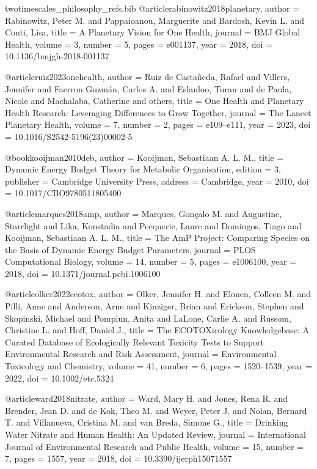 \begin{filecontents*}{twotimescales_philosophy_refs.bib}
@article{rabinowitz2018planetary,
  author  = {Rabinowitz, Peter M. and Pappaioanou, Marguerite and Bardosh, Kevin L. and Conti, Lisa},
  title   = {A Planetary Vision for One Health},
  journal = {BMJ Global Health},
  volume  = {3},
  number  = {5},
  pages   = {e001137},
  year    = {2018},
  doi     = {10.1136/bmjgh-2018-001137}
}

@article{ruiz2023onehealth,
  author  = {Ruiz de Casta{\~n}eda, Rafael and Villers, Jennifer and Faerron Guzm{\'a}n, Carlos A. and Eslanloo, Turan and de Paula, Nicole and Machalaba, Catherine and others},
  title   = {One Health and Planetary Health Research: Leveraging Differences to Grow Together},
  journal = {The Lancet Planetary Health},
  volume  = {7},
  number  = {2},
  pages   = {e109--e111},
  year    = {2023},
  doi     = {10.1016/S2542-5196(23)00002-5}
}

@book{kooijman2010deb,
  author    = {Kooijman, Sebastiaan A. L. M.},
  title     = {Dynamic Energy Budget Theory for Metabolic Organisation},
  edition   = {3},
  publisher = {Cambridge University Press},
  address   = {Cambridge},
  year      = {2010},
  doi       = {10.1017/CBO9780511805400}
}

@article{marques2018amp,
  author  = {Marques, Gon{\c{c}}alo M. and Augustine, Starrlight and Lika, Konstadia and Pecquerie, Laure and Domingos, Tiago and Kooijman, Sebastiaan A. L. M.},
  title   = {The AmP Project: Comparing Species on the Basis of Dynamic Energy Budget Parameters},
  journal = {PLOS Computational Biology},
  volume  = {14},
  number  = {5},
  pages   = {e1006100},
  year    = {2018},
  doi     = {10.1371/journal.pcbi.1006100}
}

@article{olker2022ecotox,
  author  = {Olker, Jennifer H. and Elonen, Colleen M. and Pilli, Anne and Anderson, Arne and Kinziger, Brian and Erickson, Stephen and Skopinski, Michael and Pomplun, Anita and LaLone, Carlie A. and Russom, Christine L. and Hoff, Daniel J.},
  title   = {The ECOTOXicology Knowledgebase: A Curated Database of Ecologically Relevant Toxicity Tests to Support Environmental Research and Risk Assessment},
  journal = {Environmental Toxicology and Chemistry},
  volume  = {41},
  number  = {6},
  pages   = {1520--1539},
  year    = {2022},
  doi     = {10.1002/etc.5324}
}

@article{ward2018nitrate,
  author  = {Ward, Mary H. and Jones, Rena R. and Brender, Jean D. and de Kok, Theo M. and Weyer, Peter J. and Nolan, Bernard T. and Villanueva, Cristina M. and van Breda, Simone G.},
  title   = {Drinking Water Nitrate and Human Health: An Updated Review},
  journal = {International Journal of Environmental Research and Public Health},
  volume  = {15},
  number  = {7},
  pages   = {1557},
  year    = {2018},
  doi     = {10.3390/ijerph15071557}
}


\end{filecontents*}
